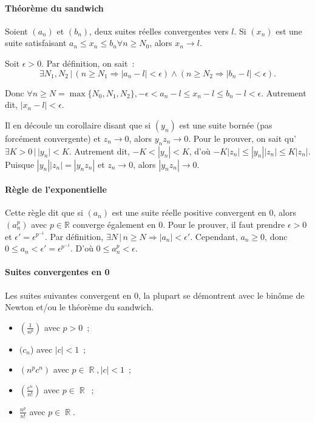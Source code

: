 \documentclass{article}
\DeclareMathOperator{\R}{\mathbb R}
\theoremstyle{definition}
\theoremstyle{remark}
\begin{document}
			\paragraph{Théorème du sandwich} Soient $(a_n)$ et $(b_n)$, deux suites réelles convergentes vers $l$. Si $(x_n)$ est une suite satisfaisant
			$a_n \leq x_n \leq b_n \forall n \geq N_0$, alors $x_n \to l$.

			Soit $\epsilon > 0$. Par définition, on sait~:
			\[\exists N_1, N_2 \, | \, (n \geq N_1 \Rightarrow |a_n - l| < \epsilon) \land (n \geq N_2 \Rightarrow |b_n - l| < \epsilon).\]

			Donc $\forall n \geq N = \max \{N_0, N_1, N_2\}, -\epsilon < a_n - l \leq x_n - l \leq b_n - l < \epsilon$. Autrement dit, $|x_n - l| < \epsilon$.

			Il en découle un corollaire disant que si $(y_n)$ est une suite bornée (pas forcément convergente) et $z_n \to 0$, alors $y_nz_n \to 0$. Pour le prouver,
			on sait qu'$\exists K > 0 \, | \, |y_n| < K$. Autrement dit, $-K < |y_n| < K$, d'où $-K|z_n| \leq |y_n||z_n| \leq K|z_n|$. Puisque $|y_n||z_n| = |y_nz_n|$ et
			$z_n \to 0$, alors $|y_nz_n| \to 0$.

			\paragraph{Règle de l'exponentielle} Cette règle dit que si $(a_n)$ est une suite réelle positive convergent en 0, alors $(a_n^p)$ avec $p \in \mathbb R$
			converge également en 0. Pour le prouver, il faut prendre $\epsilon > 0$ et $\epsilon' = \epsilon^{p^{-1}}$. Par définition,
			$\exists N \, | \, n \geq N \Rightarrow |a_n| < \epsilon'$. Cependant, $a_n \geq 0$, donc $0 \leq a_n < \epsilon' = \epsilon^{p^{-1}}$. D'où
			$0 \leq a_n^p < \epsilon$.

			\paragraph{Suites convergentes en 0} Les suites suivantes convergent en 0, la plupart se démontrent avec le binôme de Newton et/ou le théorème du sandwich.

			\begin{itemize}
				\item $(\frac {1}{n^p})$ avec $p > 0$~;
				\item $(c_n$) avec $|c| < 1$~;
				\item $(n^pc^n)$ avec $p \in \R, |c| < 1$~;
				\item $(\frac {c^n}{n!})$ avec $p \in \R$~;
				\item $\frac {n^p}{n!}$ avec $p \in \R$.
			\end{itemize}
\end{document}
